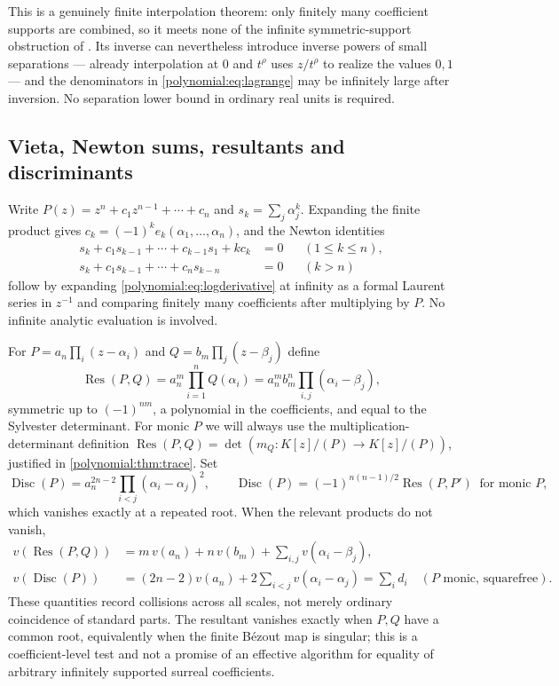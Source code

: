 \documentclass[11pt,letterpaper]{article}
\numberwithin{equation}{section}
\theoremstyle{definition}
\theoremstyle{remark}\newtheorem{remark}[theorem]{Remark}
\newcommand{\Res}{\operatorname{Res}}
\newcommand{\Disc}{\operatorname{Disc}}
\begin{document}
This is a genuinely finite interpolation theorem: only finitely many
coefficient supports are combined, so it meets none of the infinite
symmetric-support obstruction of \cite{polynomial:SourceGlobal}. Its inverse
can nevertheless introduce inverse powers of small separations --- already
interpolation at $0$ and $t^\rho$ uses $z/t^\rho$ to realize the values $0,1$
--- and the denominators in \eqref{polynomial:eq:lagrange} may be infinitely
large after inversion. No separation lower bound in ordinary real units is
required.

\subsection{Vieta, Newton sums, resultants and discriminants}
Write $P(z)=z^n+c_1z^{n-1}+\cdots+c_n$ and $s_k=\sum_j\alpha_j^k$. Expanding
the finite product gives $c_k=(-1)^ke_k(\alpha_1,\ldots,\alpha_n)$, and the
Newton identities
\begin{align}
 s_k+c_1s_{k-1}+\cdots+c_{k-1}s_1+kc_k&=0 &&(1\le k\le n),
 \label{polynomial:eq:newton1}\\
 s_k+c_1s_{k-1}+\cdots+c_ns_{k-n}&=0 &&(k>n)
 \label{polynomial:eq:newton2}
\end{align}
follow by expanding \eqref{polynomial:eq:logderivative} at infinity as a
formal Laurent series in $z^{-1}$ and comparing finitely many coefficients
after multiplying by $P$. No infinite analytic evaluation is involved.

For $P=a_n\prod_i(z-\alpha_i)$ and $Q=b_m\prod_j(z-\beta_j)$ define
\begin{equation}\label{polynomial:eq:resultantproduct}
 \Res(P,Q)=a_n^m\prod_{i=1}^nQ(\alpha_i)=a_n^mb_m^n\prod_{i,j}(\alpha_i-\beta_j),
\end{equation}
symmetric up to $(-1)^{nm}$, a polynomial in the coefficients, and equal to
the Sylvester determinant. For monic $P$ we will always use the
multiplication-determinant definition $\Res(P,Q)=\det(m_Q:K[z]/(P)\to
K[z]/(P))$, justified in \cref{polynomial:thm:trace}. Set
\begin{equation}\label{polynomial:eq:discdef}
 \Disc(P)=a_n^{2n-2}\prod_{i<j}(\alpha_i-\alpha_j)^2,
 \qquad
 \Disc(P)=(-1)^{n(n-1)/2}\Res(P,P')\ \text{ for monic }P,
\end{equation}
which vanishes exactly at a repeated root. When the relevant products do not
vanish,
\begin{align}
 v(\Res(P,Q))&=m\,v(a_n)+n\,v(b_m)+\sum_{i,j}v(\alpha_i-\beta_j),
 \label{polynomial:eq:resval}\\
 v(\Disc(P))&=(2n-2)v(a_n)+2\sum_{i<j}v(\alpha_i-\alpha_j)
 =\sum_i d_i\quad(P\text{ monic, squarefree}).\label{polynomial:eq:discval}
\end{align}
These quantities record collisions across all scales, not merely ordinary
coincidence of standard parts. The resultant vanishes exactly when $P,Q$ have
a common root, equivalently when the finite B\'ezout map is singular; this is
a coefficient-level test and not a promise of an effective algorithm for
equality of arbitrary infinitely supported surreal coefficients.
\end{document}

